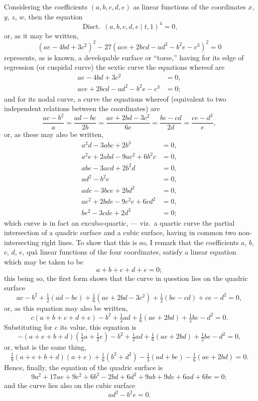 \documentclass[11pt,a4paper]{article}
\DeclareMathOperator{\Disc}{Disct.}
\begin{document}

\bigskip

\noindent Considering the coefficients $(a,b,c,d,e)$ as linear functions of the coordinates $x$, $y$, $z$, $w$, then the equation
\[
\Disc\,(a,b,c,d,e\mid t,1)^4 = 0,
\]
or, as it may be written,
\[
(ae - 4bd + 3c^2)^2 - 27(ace + 2bcd - ad^2 - b^2 e - c^3)^2 = 0
\]
represents, as is known, a developable surface or ``torse,'' having for its edge of regression (or cuspidal curve) the sextic curve the equations whereof are
\begin{align*}
ae - 4bd + 3c^2 &= 0, \\
ace + 2bcd - ad^2 - b^2 e - c^3 &= 0;
\end{align*}
and for its nodal curve, a curve the equations whereof (equivalent to two independent relations between the coordinates) are
\[
\frac{ac-b^2}{a} = \frac{ad-bc}{2b} = \frac{ae+2bd-3c^2}{6c} = \frac{be-cd}{2d} = \frac{ce-d^2}{e},
\]
or, as these may also be written,
\begin{align*}
a^2 d - 3abc + 2b^3 &= 0, \\
a^2 e + 2abd - 9ac^2 + 6b^2 c &= 0, \\
abe - 3acd + 2b^2 d &= 0, \\
ad^2 - b^2 e &= 0, \\
ade - 3bce + 2bd^2 &= 0, \\
ae^2 + 2bde - 9c^2 e + 6cd^2 &= 0, \\
be^2 - 3cde + 2d^3 &= 0;
\end{align*}
which curve is in fact an excubo-quartic, --- viz.\ a quartic curve the partial intersection of a quadric surface and a cubic surface, having in common two non-intersecting right lines. To show that this is so, I remark that the coefficients $a$, $b$, $c$, $d$, $e$, qu\^{a} linear functions of the four coordinates, satisfy a linear equation which may be taken to be
\[
a + b + c + d + e = 0;
\]
this being so, the first form shows that the curve in question lies on the quadric surface
\[
ac - b^2 + \tfrac{1}{2}(ad - bc) + \tfrac{1}{6}(ae + 2bd - 3c^2) + \tfrac{1}{2}(be - cd) + ce - d^2 = 0,
\]
or, as this equation may also be written,
\[
c(a+b+c+d+e) - b^2 + \tfrac{1}{2}ad + \tfrac{1}{6}(ae+2bd) + \tfrac{1}{2}be - d^2 = 0.
\]
Substituting for $c$ its value, this equation is
\[
-(a+e+b+d)(\tfrac{1}{2}a + \tfrac{1}{2}e) - b^2 + \tfrac{1}{2}ad + \tfrac{1}{6}(ae+2bd) + \tfrac{1}{2}be - d^2 = 0,
\]
or, what is the same thing,
\[
\tfrac{1}{9}(a+e+b+d)(a+e) + \tfrac{1}{6}(b^2+d^2) - \tfrac{1}{3}(ad+be) - \tfrac{1}{6}(ae+2bd) = 0.
\]
Hence, finally, the equation of the quadric surface is
\[
9a^2 + 17ae + 9e^2 + 6b^2 - 2bd + 6d^2 + 9ab + 9de + 6ad + 6be = 0;
\]
and the curve lies also on the cubic surface
\[
ad^2 - b^2 e = 0.
\]
\end{document}
